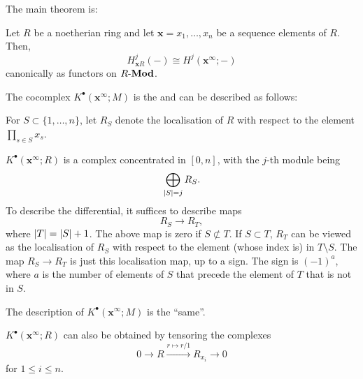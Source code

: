 \documentclass[12pt]{article}
\begin{document}
The main theorem is:
\begin{thm} \label{thm:cech-cohomology-is-local-cohomology}
	Let $R$ be a noetherian ring and let $\mathbf{x} = x_{1}, \ldots, x_{n}$ be a sequence elements of $R$. Then,
	\begin{equation*} 
		H_{\mathbf{x} R}^{j}(-) \cong H^{j}(\mathbf{x}^{\infty}; -)
	\end{equation*}
	canonically as functors on $R\text{-}\mathbf{Mod}$.
\end{thm}

The cocomplex $K^{\bullet}(\mathbf{x}^{\infty}; M)$ is the  and can be described as follows: 

For $S \subset \{1, \ldots, n\}$, let $R_{S}$ denote the localisation of $R$ with respect to the element $\prod_{s \in S} x_{s}$.

$K^{\bullet}(\mathbf{x}^{\infty}; R)$ is a complex concentrated in $[0, n]$, with the $j$-th module being
\begin{equation*} 
	\bigoplus_{{\left\lvert S \right\lvert} = j} R_{S}.
\end{equation*}
To describe the differential, it suffices to describe maps
\begin{equation*} 
	R_{S} \to R_{T},
\end{equation*}
where ${\left\lvert T \right\lvert} = {\left\lvert S \right\lvert} + 1$. The above map is zero if $S \not\subset T$. If $S \subset T$, $R_{T}$ can be viewed as the localisation of $R_{S}$ with respect to the element (whose index is) in $T \setminus S$. The map $R_{S} \to R_{T}$ is just this localisation map, up to a sign. The sign is $(-1)^{a}$, where $a$ is the number of elements of $S$ that precede the element of $T$ that is not in $S$. 

The description of $K^{\bullet}(\mathbf{x}^{\infty}; M)$ is the ``same''. 

$K^{\bullet}(\mathbf{x}^{\infty}; R)$ can also be obtained by tensoring the complexes
\begin{equation*} 
	0 \to R \xrightarrow{r \mapsto r/1} R_{x_{i}} \to 0
\end{equation*}
for $1 \le i \le n$.
\end{document}
